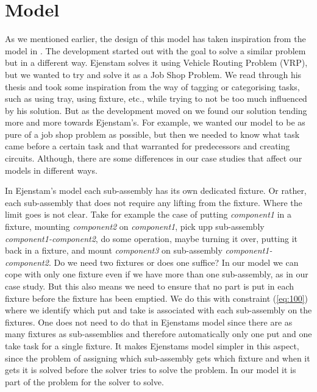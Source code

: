 \section{Model}
As we mentioned earlier, the design of this model has taken inspiration from the model in \cite{ejenstam_2014}. The development started out with the goal to solve a similar problem but in a different way. Ejenstam solves it using Vehicle Routing Problem (VRP), but we wanted to try and solve it as a Job Shop Problem. We read through his thesis and took some inspiration from the way of tagging or categorising tasks, such as using tray, using fixture, etc., while trying to not be too much influenced by his solution. But as the development moved on we found our solution tending more and more towards Ejenstam's. For example, we wanted our model to be as pure of a job shop problem as possible, but then we needed to know what task came before a certain task and that warranted for predecessors and creating circuits. Although, there are some differences in our case studies that affect our models in different ways.

In Ejenstam's model each sub-assembly has its own dedicated fixture. Or rather, each sub-assembly that does not require any lifting from the fixture. Where the limit goes is not clear. Take for example the case of putting \emph{component1} in a fixture, mounting \emph{component2} on \emph{component1}, pick upp sub-assembly \emph{component1-component2}, do some operation, maybe turning it over, putting it back in a fixture, and mount \emph{component3} on sub-assembly \emph{component1-component2}. Do we need two fixtures or does one suffice? In our model we can cope with only one fixture even if we have more than one sub-assembly, as in our case study. But this also means we need to ensure that no part is put in each fixture before the fixture has been emptied. We do this with constraint (\ref{eq:100}) where we identify which put and take is associated with each sub-assembly on the fixtures. One does not need to do that in Ejenstams model since there are as many fixtures as sub-assemblies and therefore automatically only one put and one take task for a single fixture. It makes Ejenstams model simpler in this aspect, since the problem of assigning which sub-assembly gets which fixture and when it gets it is solved before the solver tries to solve the problem. In our model it is part of the problem for the solver to solve.

